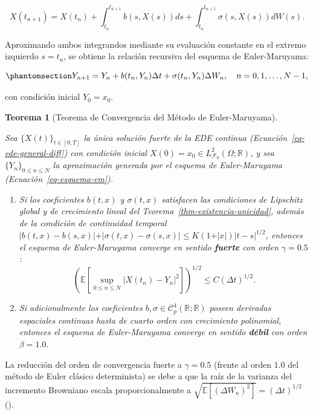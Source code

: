 \documentclass[
  spanish,
  us-letterpaper,
]{scrreprt}
\providecommand{\tightlist}{%
  \setlength{\itemsep}{0pt}\setlength{\parskip}{0pt}}
\numberwithin{equation}{section}
\theoremstyle{plain}
\newtheorem{theorem}{Teorema}[chapter]
\theoremstyle{plain}
\theoremstyle{definition}
\theoremstyle{plain}
\theoremstyle{remark}
\begin{document}
\[
X(t_{n+1}) = X(t_n) + \int_{t_n}^{t_{n+1}} b(s, X(s)) ds + \int_{t_n}^{t_{n+1}} \sigma(s, X(s)) dW(s).
\]

Aproximando ambos integrandos mediante su evaluación constante en el
extremo izquierdo \(s = t_n\), se obtiene la relación recursiva del
esquema de Euler-Maruyama:

\begin{equation}\phantomsection\label{eq-esquema-em}{
Y_{n+1} = Y_n + b(t_n, Y_n) \Delta t + \sigma(t_n, Y_n) \Delta W_n, \quad n = 0, 1, \dots, N - 1,
}\end{equation}

con condición inicial \(Y_0 = x_0\).

\begin{theorem}[Teorema de Convergencia del Método de
Euler-Maruyama]\protect\hypertarget{thm-euler-maruyama}{}\label{thm-euler-maruyama}

Sea \(\{X(t)\}_{t \in [0, T]}\) la única solución fuerte de la EDE
continua (Ecuación~\ref{eq-ede-general-diff}) con condición inicial
\(X(0) = x_0 \in L^2_{\mathcal{F}_0}(\Omega; \mathbb{R})\), y sea
\(\{Y_n\}_{0 \le n \le N}\) la aproximación generada por el esquema de
Euler-Maruyama (Ecuación~\ref{eq-esquema-em}).

\begin{enumerate}
\def\labelenumi{\arabic{enumi}.}
\tightlist
\item
  Si los coeficientes \(b(t, x)\) y \(\sigma(t, x)\) satisfacen las
  condiciones de Lipschitz global y de crecimiento lineal del
  Teorema~\ref{thm-existencia-unicidad}, además de la condición de
  continuidad temporal
  \(\vert b(t, x) - b(s, x) \vert + \vert \sigma(t, x) - \sigma(s, x) \vert \le K(1 + \vert x \vert)\vert t - s \vert^{1/2}\),
  entonces el esquema de Euler-Maruyama converge en sentido
  \textbf{fuerte} con orden \(\gamma = 0.5\): \[
  \left( \mathbb{E}\left[ \sup_{0 \le n \le N} \vert X(t_n) - Y_n \vert^2 \right] \right)^{1/2} \le C (\Delta t)^{1/2}.
  \]
\item
  Si adicionalmente los coeficientes
  \(b, \sigma \in \mathcal{C}_p^{4}(\mathbb{R}; \mathbb{R})\) poseen
  derivadas espaciales continuas hasta de cuarto orden con crecimiento
  polinomial, entonces el esquema de Euler-Maruyama converge en sentido
  \textbf{débil} con orden \(\beta = 1.0\).
\end{enumerate}

\end{theorem}

La reducción del orden de convergencia fuerte a \(\gamma = 0.5\) (frente
al orden \(1.0\) del método de Euler clásico determinista) se debe a que
la raíz de la varianza del incremento Browniano escala proporcionalmente
a \(\sqrt{\mathbb{E}[(\Delta W_n)^2]} = (\Delta t)^{1/2}\)
().
\end{document}
